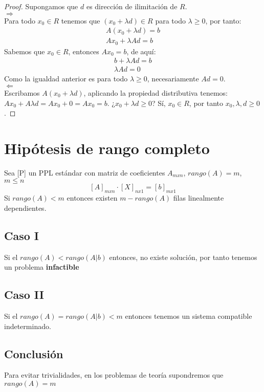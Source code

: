 \documentclass[11pt,fleqn]{book} %
\begin{document}
\begin{proof}
	Supongamos que $d$ es dirección de ilimitación de $R$. \\
	
	$\Rightarrow$ \\
	
	Para todo $x_0 \in R$ tenemos que $(x_0+\lambda d) \in R$ para todo $\lambda \geq 0$, por tanto:
	\begin{eqnarray}
		A(x_0+\lambda d) = b \\
		Ax_0+\lambda A d = b
	\end{eqnarray}
	Sabemos que $x_0 \in R$, entonces $Ax_0=b$, de aquí:
	\begin{eqnarray}
	b+\lambda A d = b \\
	\lambda A d = 0
	\end{eqnarray}
	Como la igualdad anterior es para todo $\lambda \geq 0$, necesariamente $Ad=0$. \\
	$\Leftarrow$ \\
	Escribamos $A(x_0+\lambda d)$, aplicando la propiedad distributiva tenemos: \\
	$Ax_0+A \lambda d=Ax_0+0=Ax_0=b$. ¿$x_0+\lambda d \geq 0$? Sí, $x_0 \in R$, por tanto $x_0, \lambda, d \geq 0$.  
\end{proof}

\section{Hipótesis de rango completo}
Sea [P] un PPL estándar con matriz de coeficientes $A_{mxn}$, $rango(A)=m$, $m\leq n$ \\
$$[A]_{mxn} \cdot [X]_{nx1}=[b]_{mx1}$$
Si $rango(A)<m$ entonces existen $m-rango(A)$ filas linealmente dependientes.
\subsection*{Caso I}
Si el $rango(A)<rango(A|b)$ entonces, no existe solución, por tanto tenemos un problema \textbf{infactible}
\subsection*{Caso II}
Si el $rango(A)=rango(A|b)<m$ entonces tenemos un sistema compatible indeterminado.
\subsection*{Conclusión}
Para evitar trivialidades, en los problemas de teoría supondremos que $rango(A)=m$
\end{document}
